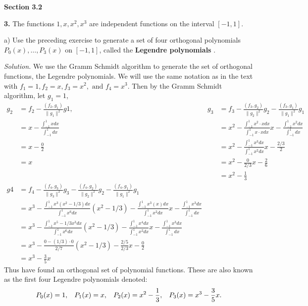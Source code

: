 \documentclass{article}
\begin{document}
\newpage
\textbf{Section 3.2}

\textbf{3.} The functions \(1, x, x^2, x^3 \) are independent functions on the interval \( [-1,1] \). 


a) Use the preceding exercise to generate a set of four orthogonal polynomials \(P_0(x), \ldots, P_3(x)\) on \( [-1, 1]\), called the \textbf{Legendre polynomials} .

\vspace{4mm} 
\textit{Solution.} We use the Gramm Schmidt algorithm to generate the set of orthogonal functions, the Legendre polynomials. We will use the same notation as in the text with \(f_1=1, f_2=x, f_3=x^2, \text{ and } f_4=x^3\). Then by the Gramm Schmidt algorithm, let \(g_1=1\),
\begin{align*}
g_2&=f_2-\frac{(f_2,g_1)}{ \|g_1\|^2}g1,     &    g_3&=f_3 -\frac{(f_3,g_2)}{ \|g_2\|^2}g_2 - \frac{(f_3,g_1)}{ \|g_1\|^2}g_1   \\ 
&= x-\frac{\int_{-1}^1 x dx}{ \int_{-1}^1 dx}     &       &= x^2-\frac{\int_{-1}^{1} x^2\cdot x dx}{ \int_{-1}^{1} x\cdot x dx}x  - \frac{\int_{-1}^1 x^2 dx}{\int_{-1}^1dx}\\
&=x- \frac{0}{2}        &        &= x^2 -\frac{\int_{-1}^1 x^3 dx}{\int_{-1}^1 x^2 dx}x - \frac{2/3}{2}\\
&=x        &        &=x^2 - \frac{0}{2/3}x- \frac{2}{6}   \\
&       &        &=x^2-\frac{1}{3}   \\
g4&= f_4- \frac{ (f_4,g_3 )}{\| g_3 \|^2}g_3 - \frac{ (f_4,g_ 2)}{\| g_2 \|^2}g_2 - \frac{ (f_4,g_1 )}{\| g_1 \|^2}g_1      &        &  \\
&= x^3- \frac{ \int_{-1}^1 x^3(x^2-1/3) dx }{\int_{-1}^1  x^6 dx}(x^2-1/3)- \frac{ \int_{-1}^1 x^3(x) dx}{\int_{-1}^1 x^2  dx}x-\frac{ \int_{-1}^1 x^3dx }{\int_{-1}^1 dx  } &        &   \\
&=x^3- \frac{ \int_{-1}^1 x^5-1/3x^3 dx }{\int_{-1}^1  x^6 dx}(x^2-1/3)- \frac{ \int_{-1}^1 x^4 dx}{\int_{-1}^1 x^2  dx}x-\frac{ \int_{-1}^1 x^3dx }{\int_{-1}^1 dx  }        &        &   \\
&=  x^3- \frac{  0-(1/3)\cdot 0 }{2/7}(x^2-1/3)- \frac{ 2/5}{2/3}x-\frac{ 0}{2 }         &        &   \\
&=  x^3-\frac{3}{5 } x     &        &  
\end{align*}
Thus have found an orthogonal set of polynomial functions. These are also known as the first four Legendre polynomials denoted:
\[ P_0(x)=1, \hspace{3mm} P_1(x)=x, \hspace{3mm} P_2(x)=x^2 -\frac{1}{3}, \hspace{3mm} P_3(x)=x^3-\frac{3}{5}x. \]
\end{document}
